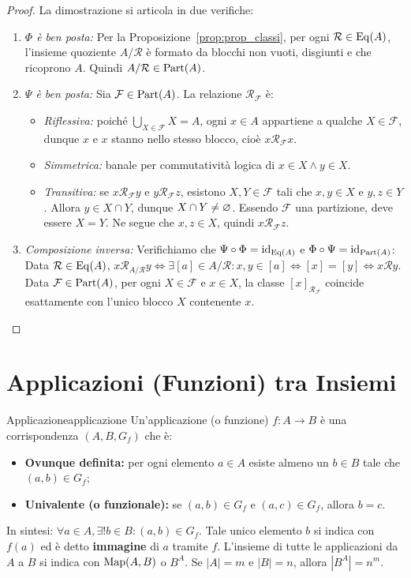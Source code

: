 \begin{proof}
La dimostrazione si articola in due verifiche:
\begin{enumerate}
    \item \emph{$\Phi$ è ben posta:} Per la Proposizione~\ref{prop:prop_classi}, per ogni $\mathcal{R} \in \operatorname{Eq}(A)$, l'insieme quoziente $A/\mathcal{R}$ è formato da blocchi non vuoti, disgiunti e che ricoprono $A$. Quindi $A/\mathcal{R} \in \operatorname{Part}(A)$.
    \item \emph{$\Psi$ è ben posta:} Sia $\mathcal{F} \in \operatorname{Part}(A)$. La relazione $\mathcal{R}_\mathcal{F}$ è:
    \begin{itemize}
        \item \emph{Riflessiva:} poiché $\bigcup_{X \in \mathcal{F}} X = A$, ogni $x \in A$ appartiene a qualche $X \in \mathcal{F}$, dunque $x$ e $x$ stanno nello stesso blocco, cioè $x \mathcal{R}_\mathcal{F} x$.
        \item \emph{Simmetrica:} banale per commutatività logica di $x \in X \wedge y \in X$.
        \item \emph{Transitiva:} se $x \mathcal{R}_\mathcal{F} y$ e $y \mathcal{R}_\mathcal{F} z$, esistono $X, Y \in \mathcal{F}$ tali che $x, y \in X$ e $y, z \in Y$. Allora $y \in X \cap Y$, dunque $X \cap Y \neq \varnothing$. Essendo $\mathcal{F}$ una partizione, deve essere $X = Y$. Ne segue che $x, z \in X$, quindi $x \mathcal{R}_\mathcal{F} z$.
    \end{itemize}
    \item \emph{Composizione inversa:} Verifichiamo che $\Psi \circ \Phi = \operatorname{id}_{\operatorname{Eq}(A)}$ e $\Phi \circ \Psi = \operatorname{id}_{\operatorname{Part}(A)}$:
    Data $\mathcal{R} \in \operatorname{Eq}(A)$, $x \mathcal{R}_{A/\mathcal{R}} y \iff \exists [a] \in A/\mathcal{R} : x, y \in [a] \iff [x] = [y] \iff x \mathcal{R} y$.
    Data $\mathcal{F} \in \operatorname{Part}(A)$, per ogni $X \in \mathcal{F}$ e $x \in X$, la classe $[x]_{\mathcal{R}_\mathcal{F}}$ coincide esattamente con l'unico blocco $X$ contenente $x$.
\end{enumerate}
\end{proof}

\section{Applicazioni (Funzioni) tra Insiemi}

\begin{definizione}{Applicazione}{applicazione}
Un'applicazione (o funzione) $f: A \to B$ è una corrispondenza $(A, B, G_f)$ che è:
\begin{itemize}
    \item \textbf{Ovunque definita:} per ogni elemento $a \in A$ esiste almeno un $b \in B$ tale che $(a, b) \in G_f$;
    \item \textbf{Univalente (o funzionale):} se $(a, b) \in G_f$ e $(a, c) \in G_f$, allora $b = c$.
\end{itemize}
In sintesi: $\forall a \in A, \exists! b \in B : (a, b) \in G_f$. Tale unico elemento $b$ si indica con $f(a)$ ed è detto \textbf{immagine} di $a$ tramite $f$.
L'insieme di tutte le applicazioni da $A$ a $B$ si indica con $\operatorname{Map}(A, B)$ o $B^A$. Se $|A| = m$ e $|B| = n$, allora $|B^A| = n^m$.
\end{definizione}

